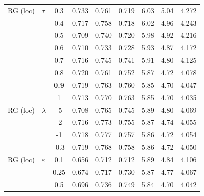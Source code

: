 \begin{longtable}{@{}l l c c c c c c c@{}}
\midrule
RG (loc) & $\tau$ & 0.3 & 0.733 & 0.761 & 0.719 & 6.03 & 5.04 & 4.272 \\
 &  & 0.4 & 0.717 & 0.758 & 0.718 & 6.02 & 4.96 & 4.243 \\
 &  & 0.5 & 0.709 & 0.740 & 0.720 & 5.98 & 4.92 & 4.216 \\
 &  & 0.6 & 0.710 & 0.733 & 0.728 & 5.93 & 4.87 & 4.172 \\
 &  & 0.7 & 0.716 & 0.745 & 0.741 & 5.91 & 4.80 & 4.125 \\
 &  & 0.8 & 0.720 & 0.761 & 0.752 & 5.87 & 4.72 & 4.078 \\
 &  & \textbf{0.9} & 0.719 & 0.763 & 0.760 & 5.85 & 4.70 & 4.047 \\
 &  & 1 & 0.713 & 0.770 & 0.763 & 5.85 & 4.70 & 4.035 \\
\midrule
RG (loc) & $\lambda$ & {-}5 & 0.708 & 0.765 & 0.745 & 5.89 & 4.80 & 4.069 \\
 &  & {-}2 & 0.716 & 0.773 & 0.755 & 5.87 & 4.74 & 4.055 \\
 &  & {-}1 & 0.718 & 0.777 & 0.757 & 5.86 & 4.72 & 4.054 \\
 &  & {-}0.3 & 0.719 & 0.768 & 0.758 & 5.86 & 4.72 & 4.050 \\
\midrule
RG (loc) & $\varepsilon$ & 0.1 & 0.656 & 0.712 & 0.712 & 5.89 & 4.84 & 4.106 \\
 &  & 0.25 & 0.674 & 0.717 & 0.730 & 5.87 & 4.77 & 4.067 \\
 &  & 0.5 & 0.696 & 0.736 & 0.749 & 5.84 & 4.70 & 4.042 \\
\end{longtable}
